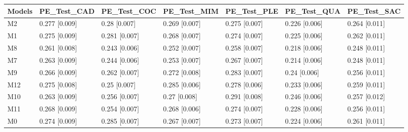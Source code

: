 \begin{table}[ht]
\centering
\begin{tabular}{lllllll}
  \hline
Models & PE\_Test\_CAD & PE\_Test\_COC & PE\_Test\_MIM & PE\_Test\_PLE & PE\_Test\_QUA & PE\_Test\_SAC \\ 
  \hline
M2 & 0.277 [0.009] & 0.28 [0.007] & 0.269 [0.007] & 0.275 [0.007] & 0.226 [0.006] & 0.264 [0.011] \\ 
  M1 & 0.275 [0.009] & 0.281 [0.007] & 0.268 [0.007] & 0.274 [0.007] & 0.225 [0.006] & 0.262 [0.011] \\ 
  M8 & 0.261 [0.008] & 0.243 [0.006] & 0.252 [0.007] & 0.258 [0.007] & 0.218 [0.006] & 0.248 [0.011] \\ 
  M7 & 0.263 [0.009] & 0.244 [0.006] & 0.253 [0.007] & 0.267 [0.007] & 0.214 [0.006] & 0.248 [0.011] \\ 
  M9 & 0.266 [0.009] & 0.262 [0.007] & 0.272 [0.008] & 0.283 [0.007] & 0.24 [0.006] & 0.256 [0.011] \\ 
  M12 & 0.275 [0.008] & 0.25 [0.007] & 0.285 [0.006] & 0.278 [0.006] & 0.233 [0.006] & 0.259 [0.011] \\ 
  M10 & 0.263 [0.009] & 0.256 [0.007] & 0.27 [0.008] & 0.291 [0.008] & 0.246 [0.006] & 0.257 [0.012] \\ 
  M11 & 0.268 [0.009] & 0.254 [0.007] & 0.268 [0.006] & 0.274 [0.007] & 0.228 [0.006] & 0.256 [0.011] \\ 
  M0 & 0.274 [0.009] & 0.285 [0.007] & 0.267 [0.007] & 0.273 [0.007] & 0.224 [0.006] & 0.261 [0.011] \\ 
   \hline
\end{tabular}
\end{table}
